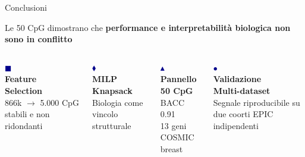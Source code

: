 \documentclass{beamer}
\begin{document}
\begin{frame}{Conclusioni}

\vspace{0.5em}
\centering
{\small Le 50 CpG dimostrano che \textbf{performance e interpretabilità
biologica non sono in conflitto}}

\vspace{1em}

\begin{columns}[t, onlytextwidth]

\centering
{\Large \textcolor{darkblue}{$\blacksquare$}}\\[4pt]
{\footnotesize \textbf{Feature\\Selection}}\\[4pt]
{\scriptsize 866k $\rightarrow$ 5.000 CpG stabili e non ridondanti}

\centering
{\Large \textcolor{darkblue}{$\blacklozenge$}}\\[4pt]
{\footnotesize \textbf{MILP\\Knapsack}}\\[4pt]
{\scriptsize Biologia come vincolo strutturale}

\centering
{\Large \textcolor{darkblue}{$\blacktriangle$}}\\[4pt]
{\footnotesize \textbf{Pannello\\50 CpG}}\\[4pt]
{\scriptsize BACC 0.91 \\ 13 geni COSMIC breast}

\centering
{\Large \textcolor{darkblue}{$\bullet$}}\\[4pt]
{\footnotesize \textbf{Validazione\\Multi-dataset}}\\[4pt]
{\scriptsize Segnale riproducibile su due coorti EPIC indipendenti}

\end{columns}

\end{frame}
\end{document}

